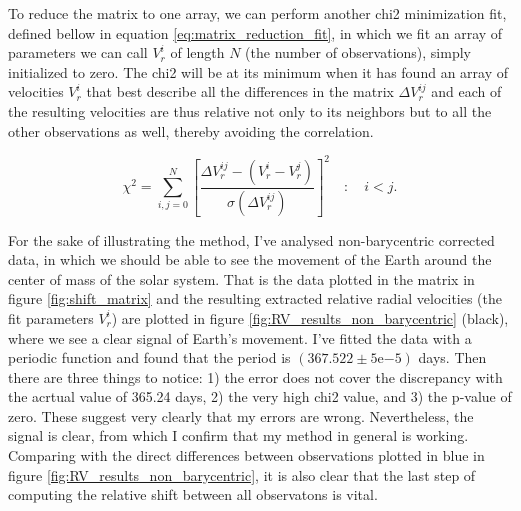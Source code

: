     To reduce the matrix to one array, we can perform another chi2 minimization fit, defined bellow in equation \ref{eq:matrix_reduction_fit}, in which we fit an array of parameters we can call $V_r^i$ of length $N$ (the number of observations), simply initialized to zero. The chi2 will be at its minimum when it has found an array of velocities $V_r^i$ that best describe all the differences in the matrix $\Delta V_r^{ij}$ and each of the resulting velocities are thus relative not only to its neighbors but to all the other observations as well, thereby avoiding the correlation.
    
    \begin{equation}
        \label{eq:matrix_reduction_fit}
        \chi^{2}=\sum_{i,j = 0}^{N}\left[\frac{ \Delta V_{r}^{ij} - (V_r^i - V_r^j) }{\sigma(\Delta V_{r}^{ij})}\right]^{2} \quad : \quad i < j.
    \end{equation}

    For the sake of illustrating the method, I've analysed non-barycentric corrected data, in which we should be able to see the movement of the Earth around the center of mass of the solar system. That is the data plotted in the matrix in figure \ref{fig:shift_matrix} and the resulting extracted relative radial velocities (the fit parameters $V_r^i$) are plotted in figure \ref{fig:RV_results_non_barycentric} (black), where we see a clear signal of Earth's movement. I've fitted the data with a periodic function and found that the period is $(367.522 \pm 5\mathrm{e}{-5})$ days. Then there are three things to notice: 1) the error does not cover the discrepancy with the acrtual value of 365.24 days, 2) the very high chi2 value, and 3) the p-value of zero. These suggest very clearly that my errors are wrong. Nevertheless, the signal is clear, from which I confirm that my method in general is working. Comparing with the direct differences between observations plotted in blue in figure \ref{fig:RV_results_non_barycentric}, it is also clear that the last step of computing the relative shift between all observatons is vital. 

